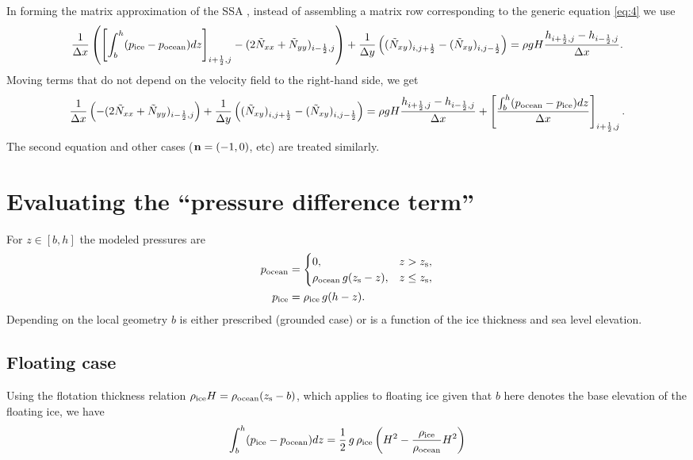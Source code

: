 \documentclass[11pt]{article}
\begin{document}
In forming the matrix approximation of the SSA \cite{BBssasliding,Winkelmannetal2011}, instead of assembling a matrix row corresponding to the generic equation \eqref{eq:4} we use
\begin{equation*}
\frac1{\Delta x}\left(\left[\int_{b}^{h}(p_{\text{ice}} - p_{\text{ocean}}) dz\right]_{i+\frac12,j} - (2\tilde N_{xx} + \tilde N_{yy})_{i-\frac12,j}\right) +
\frac1{\Delta y}\left((\tilde N_{xy})_{i,j+\frac12} - (\tilde N_{xy})_{i,j-\frac12}\right) =
\rho g H \frac{h_{i+\frac12,j} - h_{i-\frac12,j}}{\Delta x}.
\end{equation*}
Moving terms that do not depend on the velocity field to the
right-hand side, we get
\begin{equation*}
\frac1{\Delta x}\left(- (2\tilde N_{xx} + \tilde N_{yy})_{i-\frac12,j}\right) +
\frac1{\Delta y}\left((\tilde N_{xy})_{i,j+\frac12} - (\tilde N_{xy})_{i,j-\frac12}\right) =
\rho g H \frac{h_{i+\frac12,j} - h_{i-\frac12,j}}{\Delta x} + \left[\frac{\int_{b}^{h}(p_{\text{ocean}} - p_{\text{ice}}) dz}{\Delta x}\right]_{i+\frac12,j}.
\end{equation*}
The second equation and other cases ($\mathbf{n} = (-1,0)$, etc) are treated
similarly.

\section{Evaluating the ``pressure difference term''}
\label{sec-5}

For $z \in [b, h]$ the modeled pressures are
\begin{align}
p_{\text{ocean}} &= 
\begin{cases}
0, & z > z_{\text{s}},\\
\rho_{\text{ocean}}\, g (z_{\text{s}} - z), & z \le z_{\text{s}},
\end{cases}\\
p_{\text{ice}} &= \rho_{\text{ice}}\, g (h - z).
\end{align}
Depending on the local geometry $b$ is either prescribed (grounded
case) or is a function of the ice thickness and sea level elevation.

\subsection{Floating case}
\label{sec-5-1}

Using the flotation thickness relation $\rho_{\text{ice}} H = \rho_{\text{ocean}} (z_{\text{s}} - b)$, which applies to floating ice given that $b$ here denotes the base elevation of the floating ice, we have
\begin{equation*}
\int_{b}^{h}(p_{\text{ice}} - p_{\text{ocean}}) dz =
 \frac{1}{2}\, g\, \rho_{\text{ice}} \left(H^2 - \frac{\rho_{\text{ice}}}{\rho_{\text{ocean}}} H^2\right)
\end{equation*}
\end{document}
